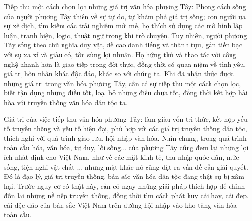 Tiếp thu một cách chọn lọc những giá trị văn hóa phương Tây: Phong cách sống của người phương Tây thiên về sự tự do, tự khám phá giá trị sống; con người ưa sự xê dịch, tìm kiếm các trải nghiệm mới mẻ, họ thích sử dụng các mô hình lập luận, tranh biện, logic, thuật ngữ trong khi trò chuyện. Tuy nhiên, người phương Tây sống theo chủ nghĩa duy vật, đề cao danh tiếng và thành tựu, gắn tiền bạc với sự xa xỉ và giàu có, tôn sùng lợi nhuận. Họ hứng thú và thao tác với công nghệ nhanh hơn là giao tiếp trong đời thực, đồng thời có quan niệm về tình yêu, giá trị hôn nhân khác độc đáo, khác so với chúng ta. Khi đã nhận thức được những giá trị trong văn hóa phương Tây, cần có sự tiếp thu một cách chọn lọc, biết tận dụng những điều tốt, loại bỏ những điều chưa tốt, đồng thời kết hợp hài hòa với truyền thống văn hóa dân tộc ta.

Giá trị của việc tiếp thu văn hóa phương Tây: làm giàu vốn tri thức, kết hợp yếu tố truyền thống và yếu tố hiện đại, phù hợp với các giá trị truyền thống dân tộc, thích nghi với quá trình giao lưu, hội nhập văn hóa. Nhìn chung, trong quá trình toàn cầu hóa, văn hóa, tư duy, lối sống... của phương Tây cũng đem lại những lợi ích nhất định cho Việt Nam, như về các mặt kinh tế, thu nhập quốc dân, mức sống, tiện nghi vật chất ... nhưng mặt khác nó cũng đặt ra vấn đề cần giải quyết. Đó là đạo lý, giá trị truyền thống, bản sắc văn hóa dân tộc đang thật sự bị xâm hại. Trước nguy cơ có thật này, cần có ngay những giải pháp thích hợp để chỉnh đốn lại những nề nếp truyền thống, đồng thời tìm cách phát huy cái hay, cái đẹp, cái độc đáo của bản sắc Việt Nam trên đường hội nhập vào kho tàng văn hóa toàn cầu.
\cleardoublepage